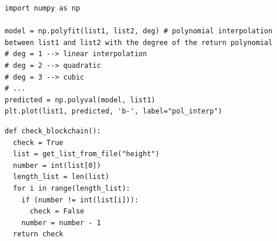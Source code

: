 \documentclass[USenglish]{uit-thesis}
\begin{document}
\begin{appendices}
\begin{lstlisting}[float, caption={Example of a polynomial interpolation of two lists using NumPy libraries.}]
import numpy as np

model = np.polyfit(list1, list2, deg) # polynomial interpolation between list1 and list2 with the degree of the return polynomial
# deg = 1 --> linear interpolation
# deg = 2 --> quadratic
# deg = 3 --> cubic
# ...
predicted = np.polyval(model, list1)
plt.plot(list1, predicted, 'b-', label="pol_interp")
\end{lstlisting}

\begin{lstlisting}[float, caption={Check the status of the local blockhain, True if valid, False if not.}]
def check_blockchain():
  check = True
  list = get_list_from_file("height")
  number = int(list[0])
  length_list = len(list)
  for i in range(length_list):
    if (number != int(list[i])):
      check = False
    number = number - 1
  return check
\end{lstlisting}

\end{appendices}

%

\end{document}
